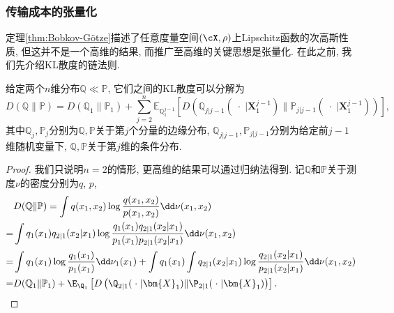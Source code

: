 \subsubsection{传输成本的张量化}
定理\ref{thm:Bobkov-Götze}描述了任意度量空间$(\cX, \rho)$上Lipschitz函数的次高斯性质, 但这并不是一个高维的结果, 而推广至高维的关键思想是张量化. 
在此之前, 我们先介绍KL散度的链法则. 
\begin{lemma}\label{lemma:ChainRuleForKLDivergence}
	给定两个$n$维分布$\mathbb{Q} \ll \mathbb{P}$, 它们之间的KL散度可以分解为
	\begin{equation*}
		D(\mathbb{Q} \| \mathbb{P})
		= D(\mathbb{Q}_1 \| \mathbb{P}_1) + \sum_{j=2}^n \mathbb{E}_{\mathbb{Q}_1^{j-1}} \left[ D\left(\mathbb{Q}_{j | j-1}(\;\cdot\; | \bm{X}_1^{j-1}) \big\| \mathbb{P}_{j | j-1}(\;\cdot\; | \bm{X}_1^{j-1})\right) \right], 
	\end{equation*}
	其中$\mathbb{Q}_j, \mathbb{P}_j$分别为$\mathbb{Q}, \mathbb{P}$关于第$j$个分量的边缘分布, $\mathbb{Q}_{j | j-1}, \mathbb{P}_{j | j-1}$分别为给定前$j-1$维随机变量下, $\mathbb{Q}, \mathbb{P}$关于第$j$维的条件分布. 
\end{lemma}
\begin{proof}
	我们只说明$n = 2$的情形, 更高维的结果可以通过归纳法得到. 
	记$\mathbb{Q}$和$\mathbb{P}$关于测度$\nu$的密度分别为$q$, $p$, 
	\begin{align*}
		& D(\mathbb{Q} \| \mathbb{P})
		= \int q(x_1, x_2) \log \frac{q(x_1, x_2)}{p(x_1, x_2)} \dd \nu(x_1, x_2) \\
		=& \int q_1(x_1) q_{2|1}(x_2|x_1) \log \frac{q_1(x_1) q_{2|1}(x_2|x_1)}{p_1(x_1) p_{2|1}(x_2|x_1)} \dd \nu(x_1, x_2) \\
		=& \int q_1(x_1) \log \frac{q_1(x_1)}{p_1(x_1)} \dd \nu_1(x_1) + \int q_1(x_1) \int q_{2|1}(x_2|x_1) \log \frac{q_{2|1}(x_2|x_1)}{p_{2|1}(x_2|x_1)} \dd \nu(x_1, x_2) \\
		=& D(\mathbb{Q}_1 \| \mathbb{P}_1) + \E_{\Q_1} \left[ D\left(\Q_{2|1}(\;\cdot\; | \bm{X}_1) \| \P_{2|1}(\;\cdot\; | \bm{X}_1)\right) \right]. 
	\end{align*}
\end{proof}

